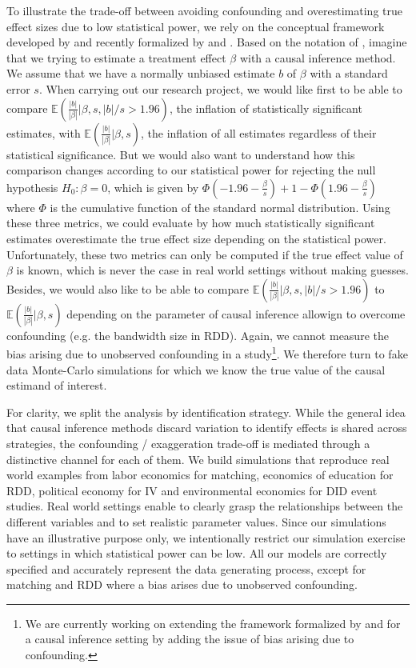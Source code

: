 \documentclass[12pt]{article}
\begin{document}
    To illustrate the trade-off between avoiding confounding and overestimating true effect sizes due to low statistical power, we rely on the conceptual framework developed by \cite{gelman_beyond_2014} and recently formalized by \cite{lu_note_2019} and \cite{zwet_significance_2021}. Based on the notation of \cite{zwet_significance_2021}, imagine that we trying to estimate a treatment effect $\beta$ with a causal inference method. We assume that we have a normally unbiased estimate $b$ of $\beta$ with a standard error $s$. When carrying out our research project, we would like first to be able to compare $\mathbb{E}(\frac{|b|}{|\beta|} | \beta, s, |b|/s>1.96)$, the inflation of statistically significant estimates, with $\mathbb{E}(\frac{|b|}{|\beta|} | \beta, s)$, the inflation of all estimates regardless of their statistical significance. But we would also want to understand how this comparison changes according to our statistical power for rejecting the null hypothesis $H_{0}: \beta = 0$, which is given by $\Phi(-1.96-\frac{\beta}{s})+1-\Phi(1.96-\frac{\beta}{s})$ where $\Phi$ is the cumulative function of the standard normal distribution. Using these three metrics, we could evaluate by how much statistically significant estimates overestimate the true effect size depending on the statistical power. Unfortunately, these two metrics can only be computed if the true effect value of $\beta$ is known, which is never the case in real world settings without making guesses. Besides, we would also like to be able to compare  $\mathbb{E}(\frac{|b|}{|\beta|} | \beta, s, |b|/s>1.96)$ to $\mathbb{E}(\frac{|b|}{|\beta|} | \beta, s)$ depending on the parameter of causal inference allowign to overcome confounding (e.g. the bandwidth size in RDD). Again, we cannot measure the bias arising due to unobserved confounding in a study\footnote{We are currently working on extending the framework formalized by \cite{lu_note_2019} and \cite{zwet_significance_2021} for a causal inference setting by adding the issue of bias arising due to confounding.}. We therefore turn to fake data Monte-Carlo simulations for which we know the true value of the causal estimand of interest.
    
    For clarity, we split the analysis by identification strategy. While the general idea that causal inference methods discard variation to identify effects is shared across strategies, the confounding / exaggeration trade-off is mediated through a distinctive channel for each of them. We build simulations that reproduce real world examples from labor economics for matching, economics of education for RDD, political economy for IV and environmental economics for DID event studies. Real world settings enable to clearly grasp the relationships between the different variables and to set realistic parameter values. Since our simulations have an illustrative purpose only, we intentionally restrict our simulation exercise to settings in which statistical power can be low. All our models are correctly specified and accurately represent the data generating process, except for matching and RDD where a bias arises due to unobserved confounding.
    
\end{document}
